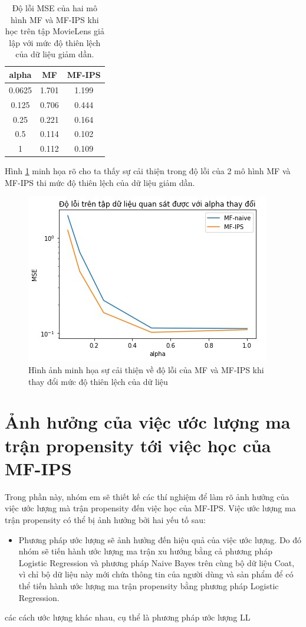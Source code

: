 \begin{table}[h]
    \centering
    \begin{tabular}{|c|c|c|}
    \hline
    alpha & MF & MF-IPS \\ \hline
    0.0625 & 1.701 & 1.199 \\ \hline
    0.125 & 0.706 & 0.444 \\ \hline
    0.25 & 0.221 & 0.164 \\ \hline
    0.5 & 0.114 & 0.102 \\ \hline
    1 & 0.112 & 0.109 \\ \hline
    \end{tabular}
    \caption{Độ lỗi MSE của hai mô hình MF và MF-IPS khi học trên tập MovieLens giả lập với mức độ thiên lệch của dữ liệu giảm dần.}
    \label{table:4_movielens}
\end{table}

Hình \ref{fig:4_movielens} minh họa rõ cho ta thấy sự cải thiện trong độ lỗi của 2 mô hình MF và MF-IPS thi mức độ thiên lệch của dữ liệu giảm dần.
\begin{figure}[h]
    \centering
    \includegraphics[width = \textwidth]{images/Chapter4/movielens.jpg}
    \caption{Hình ảnh minh họa sự cải thiện về độ lỗi của MF và MF-IPS khi thay đổi mức độ thiên lệch của dữ liệu}
    \label{fig:4_movielens}
\end{figure}

\section{Ảnh hưởng của việc ước lượng ma trận propensity tới việc học của MF-IPS}
Trong phần này, nhóm em sẽ thiết kế các thí nghiệm để làm rõ ảnh hưởng của việc ước lượng mà trận propensity đến việc học của MF-IPS. Việc ước lượng ma trận propensity có thể bị ảnh hưởng bởi hai yếu tố sau:
\begin{itemize}
    \item Phương pháp ước lượng sẽ ảnh hưởng đến hiệu quả của việc ước lượng. Do đó nhóm sẽ tiến hành ước lượng ma trận xu hướng bằng cả phương pháp Logistic Regression và phương pháp Naive Bayes trên cùng bộ dữ liệu Coat, vì chỉ bộ dữ liệu này mới chứa thông tin của người dùng và sản phẩm để có thể tiến hành ước lượng ma trận propensity bằng phương pháp Logistic Regression. 
\end{itemize}các cách ước lượng khác nhau, cụ thể là phương pháp ước lượng LL 

